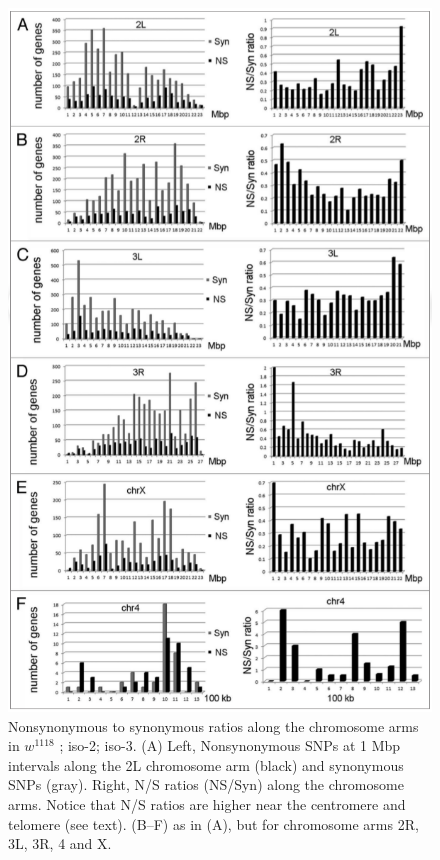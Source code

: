 \begin{figure}
    \centering
    \includegraphics[width=14cm]{snpeff_fig6.png}
    \caption{Nonsynonymous to synonymous ratios along the chromosome arms in $w^{1118}$ ; iso-2; iso-3. (A) Left, Nonsynonymous SNPs at 1 Mbp intervals along the 2L chromosome arm (black) and synonymous SNPs (gray). Right, N/S ratios (NS/Syn) along the chromosome arms. Notice that N/S ratios are higher near the centromere and telomere (see text). (B–F) as in (A), but for chromosome arms 2R, 3L, 3R, 4 and X.}
    \label{fig:snpeffTab3}
\end{figure}

